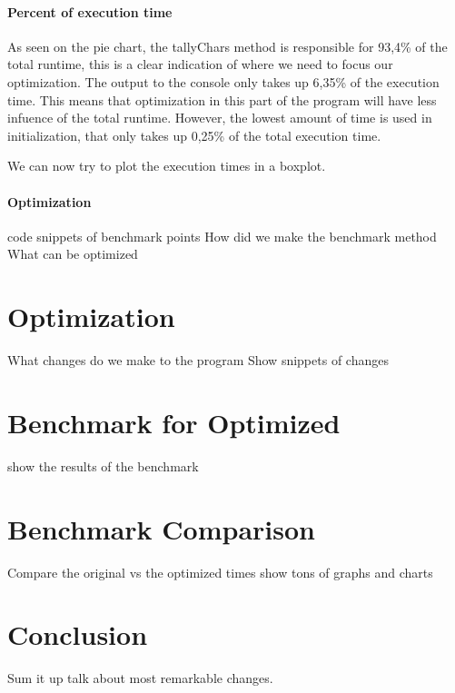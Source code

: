 \documentclass{article}
\begin{document}

\paragraph{Percent of execution time}
As seen on the pie chart, the tallyChars method is responsible for 93,4\% of the total runtime, this is a clear indication
of where we need to focus our optimization. The output to the console only takes up 6,35\% of the execution time. This means 
that optimization in this part of the program will have less infuence of the total runtime. However, the lowest amount of time 
is used in initialization, that only takes up 0,25\% of the total execution time. 

We can now try to plot the execution times in a boxplot. 

\paragraph{Optimization}


code snippets of benchmark points
How did we make the benchmark method
What can be optimized

\section{Optimization}
What changes do we make to the program
Show snippets of changes

\section{Benchmark for Optimized}
show the results of the benchmark

\section{Benchmark Comparison}
Compare the original vs the optimized times
show tons of graphs and charts

\section{Conclusion}
Sum it up 
talk about most remarkable changes.
\end{document}
